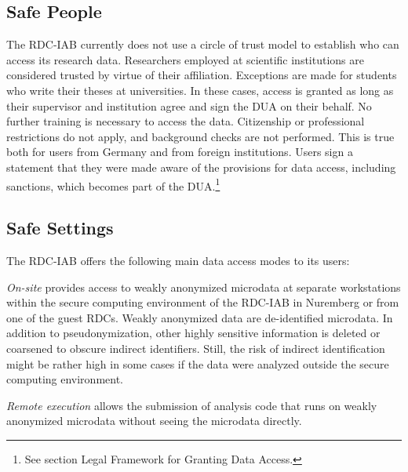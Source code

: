 \hypertarget{safe-people}{%
\subsection{Safe People}\label{safe-people}}

The RDC-IAB currently does not use a circle of trust model to establish who can access its research data. Researchers employed at scientific institutions are considered trusted by virtue of their affiliation. Exceptions are made for students who write their theses at universities. In these cases, access is granted as long as their supervisor and institution agree and sign the DUA on their behalf. No further training is necessary to access the data. Citizenship or professional restrictions do not apply, and background checks are not performed. This is true both for users from Germany and from foreign institutions. Users sign a statement that they were made aware of the provisions for data access, including sanctions, which becomes part of the DUA.\footnote{See section Legal Framework for Granting Data Access.}

\hypertarget{safe-settings}{%
\subsection{Safe Settings}\label{safe-settings}}

The RDC-IAB offers the following main data access modes to its users:

\emph{On-site} provides access to weakly anonymized microdata at separate workstations within the secure computing environment of the RDC-IAB in Nuremberg or from one of the guest RDCs. Weakly anonymized data are de-identified microdata. In addition to pseudonymization, other highly sensitive information is deleted or coarsened to obscure indirect identifiers. Still, the risk of indirect identification might be rather high in some cases if the data were analyzed outside the secure computing environment.

\emph{Remote execution} allows the submission of analysis code that runs on weakly anonymized microdata without seeing the microdata directly.

